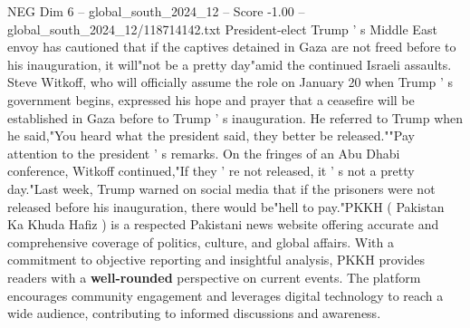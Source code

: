 \begin{textsample}{NEG Dim 6 – global\_south\_2024\_12 – Score -1.00 – global\_south\_2024\_12/118714142.txt}
President-elect Trump ' s Middle East envoy has cautioned that if the captives detained in Gaza are not freed before to his inauguration, it will"not be a pretty day"amid the continued Israeli assaults.
Steve Witkoff, who will officially assume the role on January 20 when Trump ' s government begins, expressed his hope and prayer that a ceasefire will be established in Gaza before to Trump ' s inauguration.
He referred to Trump when he said,"You heard what the president said, they better be released.""Pay attention to the president ' s remarks.
On the fringes of an Abu Dhabi conference, Witkoff continued,"If they ' re not released, it ' s not a pretty day."Last week, Trump warned on social media that if the prisoners were not released before his inauguration, there would be"hell to pay."PKKH ( Pakistan Ka Khuda Hafiz ) is a respected Pakistani news website offering accurate and comprehensive coverage of politics, culture, and global affairs.
With a commitment to objective reporting and insightful analysis, PKKH provides readers with a \textbf{well-rounded} perspective on current events.
The platform encourages community engagement and leverages digital technology to reach a wide audience, contributing to informed discussions and awareness.

\end{textsample}
